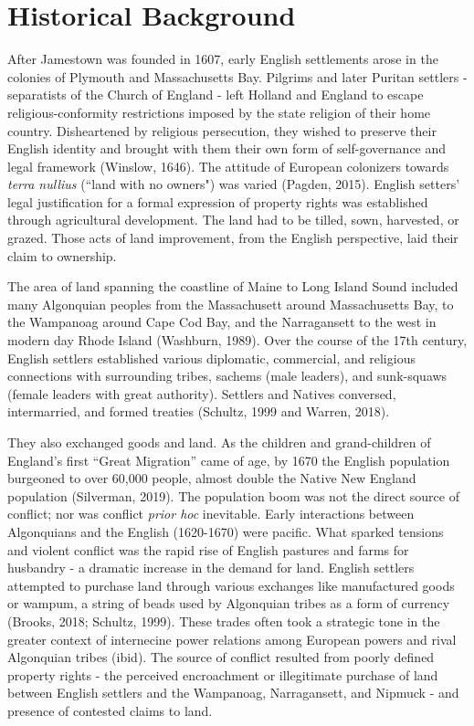 \documentclass[11pt]{article}
\begin{document}
\section{Historical Background}

After Jamestown was founded in 1607, early English settlements arose in the colonies of Plymouth and Massachusetts Bay. Pilgrims and later Puritan settlers - separatists of the Church of England - left Holland and England to escape religious-conformity restrictions imposed by the state religion of their home country. Disheartened by religious persecution, they wished to preserve their English identity and brought with them their own form of self-governance and legal framework (Winslow, 1646). The attitude of European colonizers towards {\em terra nullius} (``land with no owners") was varied (Pagden, 2015). 
English setters' legal justification for a formal expression of property rights was established through agricultural development. The land had to be tilled, sown, harvested, or grazed. Those acts of land improvement, from the English perspective, laid their claim to ownership.

The area of land spanning the coastline of Maine to Long Island Sound included many Algonquian peoples from the Massachusett around Massachusetts Bay, to the Wampanoag around Cape Cod Bay, and the Narragansett to the west in modern day Rhode Island (Washburn, 1989). Over the course of the 17th century, English settlers established various diplomatic, commercial, and religious connections with surrounding tribes, sachems (male leaders), and sunk-squaws (female leaders with great authority). Settlers and Natives conversed, intermarried, and formed treaties (Schultz, 1999 and Warren, 2018). 

They also exchanged goods and land. As the children and grand-children of England's first ``Great Migration'' came of age, by 1670 the English population burgeoned to over 60,000 people, almost double the Native New England population (Silverman, 2019). The population boom was not the direct source of conflict; nor was conflict {\em prior hoc} inevitable. Early interactions between Algonquians and the English (1620-1670) were pacific. What sparked tensions and violent conflict was the rapid rise of English pastures and farms for husbandry - a dramatic increase in the demand for land. English settlers attempted to purchase land through various exchanges like manufactured goods or wampum, a string of beads used by Algonquian tribes as a form of currency (Brooks, 2018; Schultz, 1999). These trades often took a strategic tone in the greater context of internecine power relations among European powers and rival Algonquian tribes (ibid). The source of conflict resulted from poorly defined property rights - the perceived encroachment or illegitimate purchase of land between English settlers and the Wampanoag, Narragansett, and Nipmuck - and presence of contested claims to land.
\end{document}
